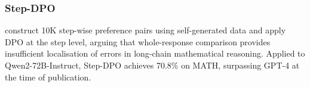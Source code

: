 

\subsubsection{Step-DPO}

\autocite{lai2024stepdpostepwisepreferenceoptimization}
construct 10K step-wise preference pairs using self-generated data
and apply DPO at the step level, arguing that whole-response
comparison provides insufficient localisation of errors in
long-chain mathematical reasoning.  Applied to Qwen2-72B-Instruct,
Step-DPO achieves 70.8\% on MATH, surpassing GPT-4 at the time of
publication.





